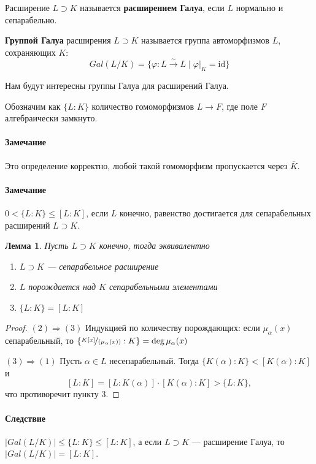 \documentclass[a4paper]{article}
\let\temp\phi
\let\phi\varphi
\let\varphi\temp
\newcommand{\id}{\mathrm{id}}
\numberwithin{theorem}{section}
\newtheorem{lemma}{Лемма}
\numberwithin{lemma}{section}
\numberwithin{proposition}{section}
\numberwithin{corollary}{section}
\begin{document}
Расширение $L \supset K$ называется \textbf{расширением Галуа},
если $L$ нормально и сепарабельно.

\textbf{Группой Галуа} расширения $L \supset K$ называется
группа автоморфизмов $L$, сохраняющих $K$:
\[Gal(L/K) = \{\phi: L \xrightarrow{\sim} L \mid \phi|_K = \id \}\]

Нам будут интересны группы Галуа для расширений Галуа.

Обозначим как $\{L:K\}$ количество гомоморфизмов $L \to F$,
где поле $F$ алгебраически замкнуто.

\paragraph*{Замечание} Это определение корректно,
любой такой гомоморфизм пропускается через $\overline{K}$.

\paragraph*{Замечание} $0 < \{L:K\} \le [L : K]$, если $L$ конечно,
равенство достигается для сепарабельных расширений $L \supset K$.

\begin{lemma}
Пусть $L \supset K$ конечно, тогда эквивалентно
\begin{enumerate}
    \item $L \supset K$ --- сепарабельное расширение
    \item $L$ порождается над $K$ сепарабельными элементами
    \item $\{L:K\} = [L : K]$
\end{enumerate}
\end{lemma}
\begin{proof} \indent

$(2) \Rightarrow (3)$ Индукцией по количеству порождающих:
если $\mu_\alpha(x)$ сепарабельный,
то $\{\nicefrac{K[x]}{(\mu_\alpha(x))} : K\} = \deg \mu_\alpha(x)$

$(3) \Rightarrow (1)$ Пусть $\alpha \in L$ несепарабельный.
Тогда $\{K(\alpha) : K\} < [K(\alpha) : K]$ и
\[[L : K] = [L : K(\alpha)] \cdot [K(\alpha) : K] > \{L : K\},\]
что противоречит пункту 3.
\end{proof}

\paragraph*{Следствие} $|Gal(L/K)| \le \{L : K\} \le [L : K]$,
а если $L \supset K$ --- расширение Галуа, то $|Gal(L/K)| = [L : K]$.
\end{document}
